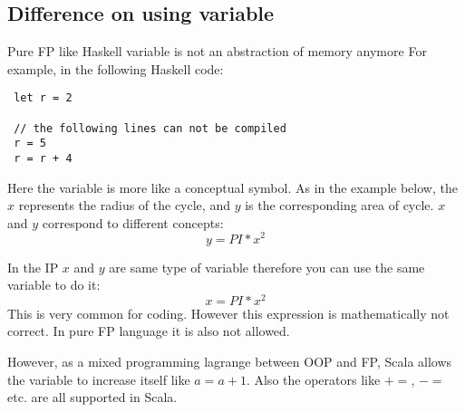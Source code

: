 \documentclass[notheorems, aspectratio=54]{beamer}
\begin{document}
\subsection{Difference on using variable}
\begin{frame}[fragile]

\begin{block}{Pure FP like Haskell variable is not an abstraction of memory anymore}
For example, in the following Haskell code:
\begin{verbatim}
 let r = 2
 
 // the following lines can not be compiled
 r = 5
 r = r + 4
\end{verbatim}
\end{block}

Here the variable is more like a conceptual symbol. As in the example below, 
the $x$ represents the radius of the cycle, and $y$ is the corresponding area of cycle. $x$ and $y$ correspond to different concepts:
\begin{equation}
y = PI*x^{2}
\end{equation}

\end{frame}

\begin{frame}[fragile]

In the IP $x$ and $y$ are same type of variable therefore you can use the same variable to do it:
\begin{equation}
x = PI*x^{2}
\end{equation}
This is very common for coding. However this expression is mathematically not correct. In pure FP language it is also not allowed.

However, as a mixed programming lagrange between OOP and FP, Scala allows the variable to increase itself like $a = a + 1$.
Also the operators like $+=$, $-=$ etc. are all supported in Scala.

\end{frame}

\end{document}
